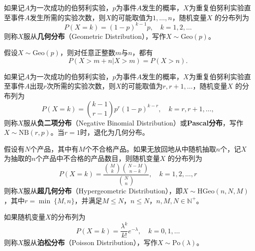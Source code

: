 \begin{definition}[几何分布]
如果记$A$为一次成功的伯努利实验，$p$为事件$A$发生的概率，$X$为重复伯努利实验直至事件$A$发生所需的实验次数，则$X$的可能取值为$1,\ldots,n$，随机变量$X$ 的分布列为
\begin{equation}
    P(X=k) = (1-p)^{k-1} p,\quad k = 1,2,\ldots
\end{equation}
则称$X$服从\textbf{几何分布}（Geometric Distribution），写作$X\sim \mathrm{Geo}(p)$。
\end{definition}

\begin{theorem}[几何分布的无记忆性]
假设$X\sim \mathrm{Geo}(p)$，则对任意正整数$m$与$n$，都有
\begin{equation}
    P(X > m + n | X > m) = P(X > n).
\end{equation}
\end{theorem}

\begin{definition}[负二项分布]
如果记$A$为一次成功的伯努利实验，$p$为事件$A$发生的概率，$X$为重复伯努利实验直至事件$A$出现$r$次所需的实验次数，则$X$的可能取值为$r,r+1,\ldots$，随机变量$X$ 的分布列为
\begin{equation}
    P(X=k) = \binom{k-1}{r-1} p^r (1-p)^{k-r},\quad k = r,r+1,\ldots,
\end{equation}
则称$X$服从\textbf{负二项分布}（Negative Binomial Distribution）或\textbf{Pascal分布}，写作$X\sim \textrm{NB}(r, p)$。当$r=1$时，退化为几何分布。
\end{definition}

\begin{definition}[超几何分布]
假设有$N$个产品，其中有$M$个不合格产品。如果无放回地从中随机抽取$n$个，记$X$为抽取的$n$个产品中不合格的产品数目，则随机变量$X$ 的分布列为
\begin{equation}
    P(X=k) = \dfrac{\binom{M}{k}\binom{N-M}{n-k}}{\binom{N}{n}},\quad k = 1,2,\ldots, r
\end{equation}
则称$X$服从\textbf{超几何分布}（Hypergeometric Distribution），即$X\sim \mathrm{HGeo}(n, N, M)$，其中$r=\min~\{M,n\}$，并满足$M\le N$，$n\le N$，$n,M,N\in \mathbb N^{+}$。
\end{definition}

\begin{definition}[泊松分布]
如果随机变量$X$的分布列为
\begin{equation}
    P(X=k) = \frac{\lambda^k}{k!} e^{-\lambda},\quad k = 0,1,\ldots
\end{equation}
则称$X$服从\textbf{泊松分布}（Poisson Distribution），写作$X\sim \mathrm{Po}(\lambda)$。
\end{definition}

